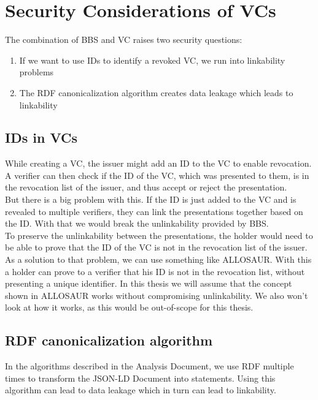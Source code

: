 \documentclass[
	a4paper               %
	,BCOR=0mm            %
	,bibliography=totoc   %
	,listof=totoc         %
	,monolingual
	,twoside=false
]{bfhthesis}              %
\begin{document}
\section{Security Considerations of VCs}
\label{subsec:vcseccons}
The combination of BBS and VC raises two security questions:
\begin{enumerate}
	\item If we want to use IDs to identify a revoked VC, we run into linkability problems
	\item The RDF canonicalization algorithm creates data leakage which leads to linkability
\end{enumerate}

\subsection{IDs in VCs}
While creating a VC, the issuer might add an ID to the VC to enable revocation.
A verifier can then check if the ID of the VC, which was presented to them, is in the revocation list of the issuer, and thus accept or reject the presentation.\\
But there is a big problem with this.
If the ID is just added to the VC and is revealed to multiple verifiers, they can link the presentations together based on the ID.
With that we would break the unlinkability provided by BBS.\\

To preserve the unlinkability between the presentations, the holder would need to be able to prove that the ID of the VC is not in the revocation list of the issuer.\\

As a solution to that problem, we can use something like ALLOSAUR\cite{allosaur}. 
With this a holder can prove to a verifier that his ID is not in the revocation list, without presenting a unique identifier.
In this thesis we will assume that the concept shown in ALLOSAUR works without compromising unlinkability.
We also won't look at how it works, as this would be out-of-scope for this thesis.

\subsection{RDF canonicalization algorithm}
In the algorithms described in the Analysis Document, we use RDF multiple times to transform the JSON-LD Document into statements. Using this algorithm can lead to data leakage which in turn can lead to linkability.\\
\end{document}

